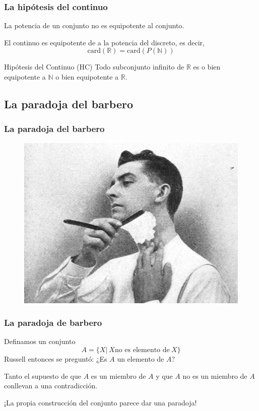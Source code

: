 \begin{frame}
 \frametitle{La hipótesis del continuo}
 
 \begin{theorem}
  La potencia de un conjunto no es equipotente al conjunto.
 \end{theorem} 
 
 \pause
 \begin{theorem}
  El continuo es equipotente de a la potencia del discreto, es decir, 
  $$ \mathrm{card}\left( \mathbb{R} \right) = \mathrm{card} \left( P(\mathbb{N}) \right)$$
 \end{theorem}
 
 \pause
 \begin{alertblock}{Hipótesis del Continuo (HC)}
  Todo subconjunto infinito de $\mathbb{R}$ es o bien equipotente a $\mathbb{N}$ o bien equipotente a $\mathbb{R}$.
 \end{alertblock}
\end{frame}


\subsection{La paradoja del barbero}

\begin{frame}
 \frametitle{La paradoja del barbero}
 
 \begin{figure}
\includegraphics[width=0.8\linewidth]{IMGS/barbero}
\end{figure}
\end{frame}

\begin{frame}
 \frametitle{La paradoja de barbero}
 
\begin{block}{}
	Definamos un conjunto
	$$
	A = \{ X | ~X \text{no es elemento de} ~X\}
	$$
	Russell entonces se preguntó: 
	¿Es $A$ un elemento de $A$?
\end{block}

\pause
Tanto el supuesto de que $A$ es un miembro de $A$ y que $A$ no es un miembro de $A$ conllevan a una contradicción. 

\pause
\begin{center}
 ¡La propia construcción del conjunto parece dar una paradoja!
\end{center}
\end{frame}

